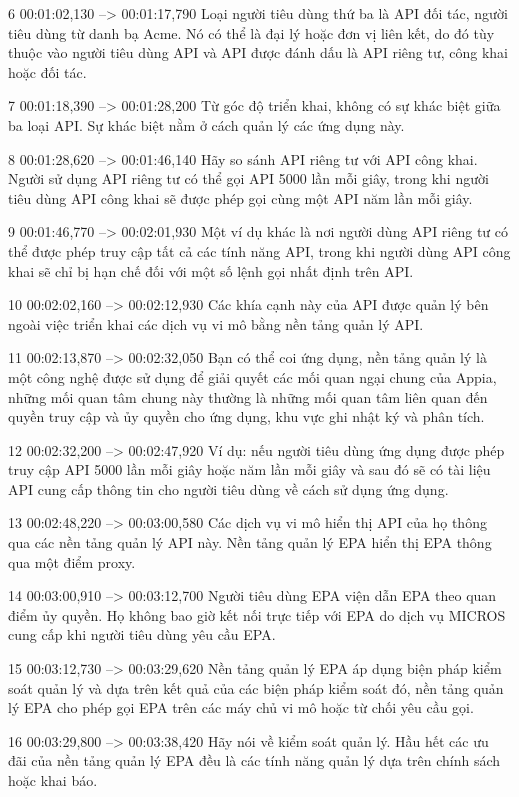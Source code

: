 6
00:01:02,130 --> 00:01:17,790
Loại người tiêu dùng thứ ba là API đối tác, người tiêu dùng từ danh bạ Acme.  Nó có thể là đại lý hoặc đơn vị liên kết, do đó tùy thuộc vào người tiêu dùng API và API được đánh dấu là API riêng tư, công khai hoặc đối tác.

7
00:01:18,390 --> 00:01:28,200
Từ góc độ triển khai, không có sự khác biệt giữa ba loại API.  Sự khác biệt nằm ở cách quản lý các ứng dụng này.

8
00:01:28,620 --> 00:01:46,140
Hãy so sánh API riêng tư với API công khai.  Người sử dụng API riêng tư có thể gọi API 5000 lần mỗi giây, trong khi người tiêu dùng API công khai sẽ được phép gọi cùng một API năm lần mỗi giây.

9
00:01:46,770 --> 00:02:01,930
Một ví dụ khác là nơi người dùng API riêng tư có thể được phép truy cập tất cả các tính năng API, trong khi người dùng API công khai sẽ chỉ bị hạn chế đối với một số lệnh gọi nhất định trên API.

10
00:02:02,160 --> 00:02:12,930
Các khía cạnh này của API được quản lý bên ngoài việc triển khai các dịch vụ vi mô bằng nền tảng quản lý API.

11
00:02:13,870 --> 00:02:32,050
Bạn có thể coi ứng dụng, nền tảng quản lý là một công nghệ được sử dụng để giải quyết các mối quan ngại chung của Appia, những mối quan tâm chung này thường là những mối quan tâm liên quan đến quyền truy cập và ủy quyền cho ứng dụng, khu vực ghi nhật ký và phân tích.

12
00:02:32,200 --> 00:02:47,920
Ví dụ: nếu người tiêu dùng ứng dụng được phép truy cập API 5000 lần mỗi giây hoặc năm lần mỗi giây và sau đó sẽ có tài liệu API cung cấp thông tin cho người tiêu dùng về cách sử dụng ứng dụng.

13
00:02:48,220 --> 00:03:00,580
Các dịch vụ vi mô hiển thị API của họ thông qua các nền tảng quản lý API này.  Nền tảng quản lý EPA hiển thị EPA thông qua một điểm proxy.

14
00:03:00,910 --> 00:03:12,700
Người tiêu dùng EPA viện dẫn EPA theo quan điểm ủy quyền.  Họ không bao giờ kết nối trực tiếp với EPA do dịch vụ MICROS cung cấp khi người tiêu dùng yêu cầu EPA.

15
00:03:12,730 --> 00:03:29,620
Nền tảng quản lý EPA áp dụng biện pháp kiểm soát quản lý và dựa trên kết quả của các biện pháp kiểm soát đó, nền tảng quản lý EPA cho phép gọi EPA trên các máy chủ vi mô hoặc từ chối yêu cầu gọi.

16
00:03:29,800 --> 00:03:38,420
Hãy nói về kiểm soát quản lý.  Hầu hết các ưu đãi của nền tảng quản lý EPA đều là các tính năng quản lý dựa trên chính sách hoặc khai báo.

